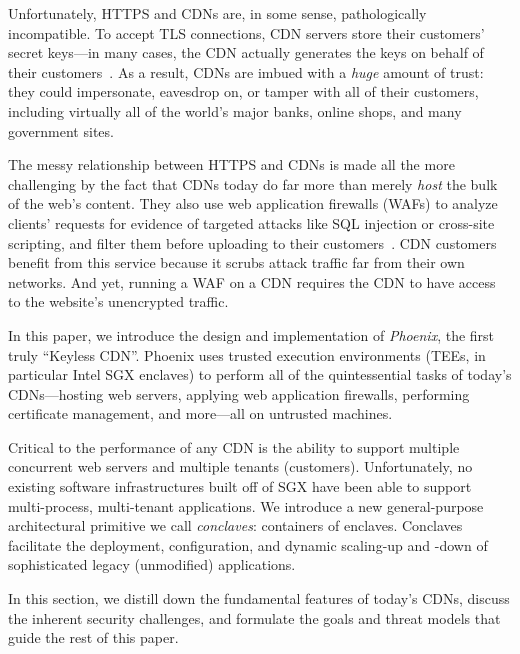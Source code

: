 Unfortunately, HTTPS and CDNs are, in some sense, pathologically incompatible.
%
To accept TLS connections, CDN servers store their customers' secret keys---in
many cases, the CDN actually generates the keys on behalf of their
customers~\cite{key-sharing,when-https-meets-cdn}.
%
As a result, CDNs are imbued with a \emph{huge} amount of trust: they could
impersonate, eavesdrop on, or tamper with all of their customers, including
virtually all of the world's major banks, online shops, and many government
sites.


The messy relationship between HTTPS and CDNs is made all the more challenging
by the fact that CDNs today do far more than merely \emph{host} the bulk of the
web's content.
%
They also use web application firewalls (WAFs) to analyze clients' requests for
evidence of targeted attacks like SQL injection or cross-site scripting, and
filter them before uploading to their customers~\cite{securing-cdns}.
%
CDN customers benefit from this service because it scrubs attack traffic far
from their own networks.
%
And yet, running a WAF on a CDN requires the CDN to have access to the
website's unencrypted traffic.






In this paper, we introduce the design and implementation of
\emph{Phoenix}, the first truly ``Keyless CDN''.
%
Phoenix uses trusted execution environments (TEEs, in particular Intel
SGX enclaves) to perform all of the quintessential tasks of today's
CDNs---hosting web servers, applying web application firewalls,
performing certificate management, and more---all on untrusted
machines.


Critical to the performance of any CDN is the ability to support
multiple concurrent web servers and multiple tenants (customers).
%
Unfortunately, no existing software infrastructures built off of SGX
have been able to support multi-process, multi-tenant applications.
%
We introduce a new general-purpose architectural primitive we call
\emph{conclaves}: containers of enclaves.
%
Conclaves facilitate the deployment, configuration, and dynamic
scaling-up and -down of sophisticated legacy (unmodified) applications.



In this section, we distill down the fundamental features of today's
CDNs, discuss the inherent security challenges, and formulate the goals
and threat models that guide the rest of this paper.


